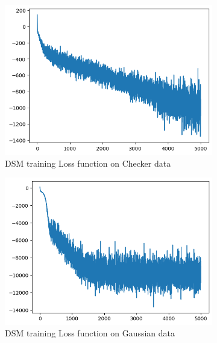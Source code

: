 \documentclass[11pt]{article}
\begin{document}
	\begin{figure}[H]
		\centering 
		\begin{subfigure}{0.45\textwidth}
			\centering
			\includegraphics[width=\textwidth]{DSM_Checker_Loss.png}
			\caption{DSM training Loss function on Checker data}
			\label{fig:DSMChckerLoss}
		\end{subfigure}
		\hfill
		\begin{subfigure}{0.45\textwidth}
			\centering
			\includegraphics[width=\textwidth]{DSM_Gaussian_Loss.png}
			\caption{DSM training Loss function on Gaussian data}
			\label{fig:DSMGaussianLoss}
		\end{subfigure}
		\\
		\begin{subfigure}{0.45\textwidth}
			\centering

\end{subfigure}
\end{figure}
\end{document}
